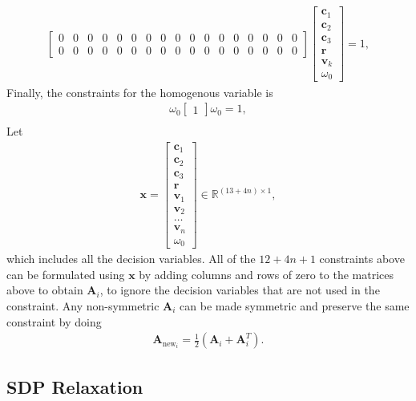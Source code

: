 \documentclass{article}
\newcommand{\mbf}[1]{\mathbf{#1}}
\begin{document}
\begin{align}
\begin{bmatrix}
        0 & 0 & 0 & 0 & 0 & 0 & 0 & 0 & 0 & 0 & 0 & 0 & 0 & 0 & 0 & 0 & 0 \\
        0 & 0 & 0 & 0 & 0 & 0 & 0 & 0 & 0 & 0 & 0 & 0 & 0 & 0 & 0 & 0 & 0
    \end{bmatrix}
    \begin{bmatrix}
        \mbf{c}_1 \\
        \mbf{c}_2 \\
        \mbf{c}_3 \\
        \mbf{r} \\
        \mbf{v}_k \\
        \omega_0
    \end{bmatrix} = 1,
\end{align}
Finally, the constraints for the homogenous variable is 
\begin{align}
    \omega_0 \begin{bmatrix} 1 \end{bmatrix} \omega_0 = 1,\\
\end{align}
Let
\begin{align}
\mbf{x} = \begin{bmatrix} \mbf{c}_1 \\ \mbf{c}_2 \\ \mbf{c}_3 \\ \mbf{r} \\ \mbf{v}_1 \\ \mbf{v}_2 \\ \dots \\ \mbf{v}_n \\ \omega_0 \end{bmatrix} \in \mathbb{R}^{(13 + 4n) \times 1},
\end{align}
which includes all the decision variables. 
All of the $12 + 4n + 1$ constraints above can be formulated using $\mbf{x}$ by adding columns and rows of zero to the matrices above to obtain $\mbf{A}_i$,
to ignore the decision variables that are not used in the constraint. Any non-symmetric $\mbf{A}_i$ can be made symmetric and preserve the same constraint by doing
\begin{align}
    \mbf{A}_{\text{new}_i} = \frac{1}{2}(\mbf{A}_i + \mbf{A}_i^T).
\end{align}

\subsection{SDP Relaxation}
\end{document}
